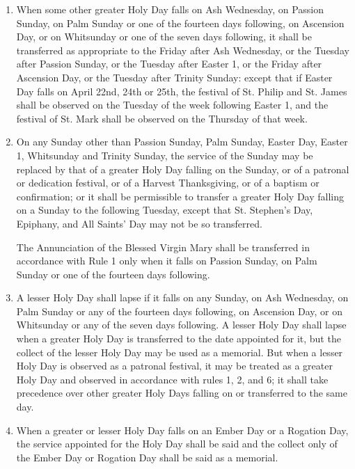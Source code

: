 
\begin{enumerate}

    \item When some other greater Holy Day falls on Ash Wednesday, on Passion Sunday, on Palm Sunday or one of the fourteen days following, on Ascension Day, or on Whitsunday or one of the seven days following, it shall be transferred as appropriate to the Friday after Ash Wednesday, or the Tuesday after Passion Sunday, or the Tuesday after Easter 1, or the Friday after Ascension Day, or the Tuesday after Trinity Sunday: except that if Easter Day falls on April 22nd, 24th or 25th, the festival of St. Philip and St. James shall be observed on the Tuesday of the week following Easter 1, and the festival of St. Mark shall be observed on the Thursday of that week.

    \item On any Sunday other than Passion Sunday, Palm Sunday, Easter Day, Easter 1, Whitsunday and Trinity Sunday, the service of the Sunday may be replaced by that of a greater Holy Day falling on the Sunday, or of a patronal or dedication festival, or of a Harvest Thanksgiving, or of a baptism or confirmation; or it shall be permissible to transfer a greater Holy Day falling on a Sunday to the following Tuesday, except that St. Stephen's Day, Epiphany, and All Saints' Day may not be so transferred.

          The Annunciation of the Blessed Virgin Mary shall be transferred in accordance with Rule 1 only when it falls on Passion Sunday, on Palm Sunday or one of the fourteen days following.

    \item A lesser Holy Day shall lapse if it falls on any Sunday, on Ash Wednesday, on Palm Sunday or any of the fourteen days following, on Ascension Day, or on Whitsunday or any of the seven days following. A lesser Holy Day shall lapse when a greater Holy Day is transferred to the date appointed for it, but the collect of the lesser Holy Day may be used as a memorial. But when a lesser Holy Day is observed as a patronal festival, it may be treated as a greater Holy Day and observed in accordance with rules 1, 2, and 6; it shall take precedence over other greater Holy Days falling on or transferred to the same day.

    \item When a greater or lesser Holy Day falls on an Ember Day or a Rogation Day, the service appointed for the Holy Day shall be said and the collect only of the Ember Day or Rogation Day shall be said as a memorial.


\end{enumerate}
